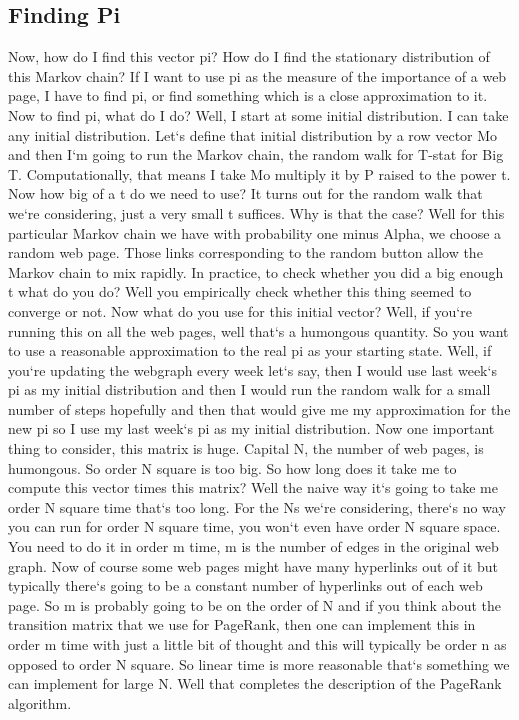 \subsection{Finding Pi}
Now, how do I find this vector pi? How do I find the stationary distribution of this Markov chain? If I want to use pi as the measure of the importance of a web page, I have to find pi, or find something which is a close approximation to it.
Now to find pi, what do I do? Well, I start at some initial distribution.
I can take any initial distribution.
Let`s define that initial distribution by a row vector Mo and then I`m going to run the Markov chain, the random walk for T-stat for Big T\@.
Computationally, that means I take Mo multiply it by P raised to the power t.
Now how big of a t do we need to use? It turns out for the random walk that we`re considering, just a very small t suffices.
Why is that the case? Well for this particular Markov chain we have with probability one minus Alpha, we choose a random web page.
Those links corresponding to the random button allow the Markov chain to mix rapidly.
In practice, to check whether you did a big enough t what do you do? Well you empirically check whether this thing seemed to converge or not.
Now what do you use for this initial vector? Well, if you`re running this on all the web pages, well that`s a humongous quantity.
So you want to use a reasonable approximation to the real pi as your starting state.
Well, if you`re updating the webgraph every week let`s say, then I would use last week`s pi as my initial distribution and then I would run the random walk for a small number of steps hopefully and then that would give me my approximation for the new pi so I use my last week`s pi as my initial distribution.
Now one important thing to consider, this matrix is huge.
Capital N, the number of web pages, is humongous.
So order N square is too big.
So how long does it take me to compute this vector times this matrix? Well the naive way it`s going to take me order N square time that`s too long.
For the Ns we`re considering, there`s no way you can run for order N square time, you won`t even have order N square space.
You need to do it in order m time, m is the number of edges in the original web graph.
Now of course some web pages might have many hyperlinks out of it but typically there`s going to be a constant number of hyperlinks out of each web page.
So m is probably going to be on the order of N and if you think about the transition matrix that we use for PageRank, then one can implement this in order m time with just a little bit of thought and this will typically be order n as opposed to order N square.
So linear time is more reasonable that`s something we can implement for large N\@.
Well that completes the description of the PageRank algorithm.

